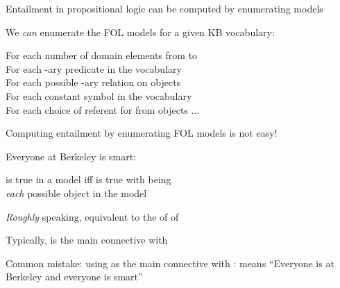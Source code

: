 \documentclass{article}
\begin{document}
\begin{huge}

Entailment in propositional logic can be computed by enumerating models

We \emph{can} enumerate the FOL models for a given KB vocabulary:

For each number of domain elements  from  to \mat{$\infty$}\\
\tab For each -ary predicate  in the vocabulary\\
\tab\tab For each possible -ary relation on  objects\\
\tab\tab\tab For each constant symbol  in the vocabulary\\
\tab\tab\tab\tab For each choice of referent for  from  objects $\ldots$

Computing entailment by enumerating FOL models is not easy!





Everyone at Berkeley is smart:\\

\quad  is true in a model  iff  is true with  being\\
\emph{each} possible object in the model

\emph{Roughly} speaking, equivalent to the  of  of 



Typically, \mat{$\implies$} is the main connective with \mat{$\forall$}

Common mistake: using \mat{$\land$} as the main connective with \mat{$\forall$}:
means ``Everyone is at Berkeley and everyone is smart''




\end{huge}
\end{document}
